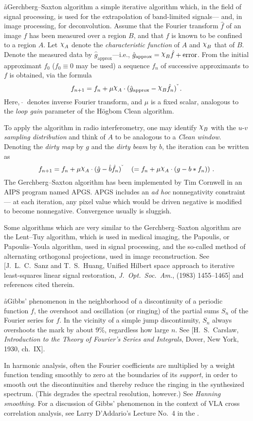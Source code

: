 \aa{Gerchberg--Saxton algorithm}
a simple iterative algorithm which, in the field of signal
processing, is used for the extrapolation of band-limited signals---%
and, in image processing, for deconvolution.
Assume that the Fourier transform $\hat f$ of an image $f$
has been measured over a region $B$, and that $f$ is known
to be confined to a region $A$.
Let $\charfn A$ denote the {\it characteristic function} of $A$
and $\charfn B$ that of $B$.
\def\ghap{\hat g_{\operatorname{approx}}}
Denote the measured data by $\ghap$---i.e.,
$\ghap=\charfn B\hat f+\operatorname{error}$.
From the initial approximant $f_0$
($f_0\equiv0$ may be used)
a sequence $f_n$ of successive approximants to $f$
is obtained, via the formula
$$f_{n+1}=f_n+\mu\charfn A\cdot(\ghap-\charfn B\hat f_n)\formcheck\,.$$
Here, $\ \check{}\ $ denotes inverse Fourier transform,
and $\mu$ is a fixed scalar, analogous to the {\it loop gain}
parameter of the H\"ogbom Clean algorithm.
\par
To apply the algorithm in radio interferometry, one may
identify $\charfn B$ with the $u$-$v$ {\it sampling distribution}
and think of $A$ to be analogous to a {\it Clean window}.
Denoting the {\it dirty map} by $g$ and the {\it dirty beam}
by $b$,
the iteration can be written as
$$f_{n+1}=f_n+\mu\charfn A\cdot(\hat g-\hat b\hat f_n)\formcheck
\quad\left(=f_n+\mu\charfn A\cdot(g-b\ast f_n)\right)\,.$$
The Gerchberg--Saxton algorithm has been implemented
by Tim Cornwell in an AIPS program named APGS.
APGS includes an {\it ad hoc} nonnegativity constraint---%
at each iteration,
any pixel value which would be driven negative
is modified to become nonnegative.
Convergence usually is sluggish.
\par
Some algorithms which are very similar to the Gerchberg--Saxton algorithm
are the Lent--Tuy algorithm, which is used in medical imaging,
the Papoulis, or Papoulis--Youla algorithm, used in signal processing,
and the so-called method of alternating orthogonal projections,
used in image reconstruction.
See [J.~L.~C.~Sanz and T.~S.~Huang,
Unified Hilbert space approach to iterative least-squares linear
signal restoration, {\it J.~Opt.\ Soc.~Am.},  (1983) 1455--1465]
and references cited therein.

\aa{Gibbs' phenomenon}
in the neighborhood of a discontinuity of a periodic function $f$,
the overshoot and oscillation (or ringing)
of the partial sums $S_n$ of the Fourier series for $f$.
In the vicinity of a simple jump discontinuity,
$S_n$ always overshoots the mark by about 9\%, regardless how large $n$.
See [H.~S.~Carslaw, {\it Introduction to the Theory of Fourier's
Series and Integrals}, Dover, New York, 1930, ch.~IX].
\par
In harmonic analysis,
often the Fourier coefficients are multiplied by a weight function
tending smoothly to zero at the boundaries of its {\it support,}
in order to smooth out the discontinuities
and thereby reduce the ringing in the synthesized spectrum.
(This degrades the spectral resolution, however.)
See {\it Hanning smoothing}.
For a discussion of Gibbs' phenomenon in the context
of VLA cross correlation analysis, see Larry D'Addario's
Lecture No.~4 in the \sira.

